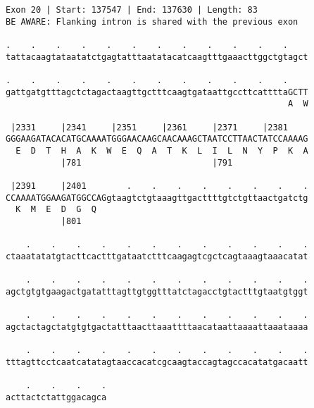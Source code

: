 \documentclass{article}
\begin{document}
\begin{Verbatim}
Exon 20 | Start: 137547 | End: 137630 | Length: 83
BE AWARE: Flanking intron is shared with the previous exon
 
.    .    .    .    .    .    .    .    .    .    .    .    
tattacaagtataatatctgagtatttaatatacatcaagtttgaaacttggctgtagct
  
.    .    .    .    .    .    .    .    .    .    .    .    
gattgatgtttagctctagactaagttgctttcaagtgataattgccttcattttaGCTT
                                                        A  W
  
 |2331     |2341     |2351     |2361     |2371     |2381    
GGGAAGATACACATGCAAAATGGGAACAAGCAACAAAGCTAATCCTTAACTATCCAAAAG
  E  D  T  H  A  K  W  E  Q  A  T  K  L  I  L  N  Y  P  K  A
           |781                          |791               
  
 |2391     |2401        .    .    .    .    .    .    .    .
CCAAAATGGAAGATGGCCAGgtaagtctgtaaagttgacttttgtctgttaactgatctg
  K  M  E  D  G  Q                                          
           |801                                             
  
    .    .    .    .    .    .    .    .    .    .    .    .
ctaaatatatgtacttcactttgataatctttcaagagtcgctcagtaaagtaaacatat
  
    .    .    .    .    .    .    .    .    .    .    .    .
agctgtgtgaagactgatatttagttgtggtttatctagacctgtactttgtaatgtggt
  
    .    .    .    .    .    .    .    .    .    .    .    .
agctactagctatgtgtgactatttaacttaaattttaacataattaaaattaaataaaa
  
    .    .    .    .    .    .    .    .    .    .    .    .
tttagttcctcaatcatatagtaaccacatcgcaagtaccagtagccacatatgacaatt
  
    .    .    .    .
acttactctattggacagca
\end{Verbatim}
\newpage
\end{document}

